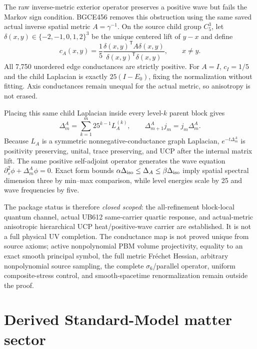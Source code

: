 \documentclass[11pt]{article}
\theoremstyle{definition}
\theoremstyle{remark}
\begin{document}
The raw inverse-metric exterior operator preserves a positive wave but fails the Markov sign condition. BGCE456 removes this obstruction using the same saved actual inverse spatial metric $A=\gamma^{-1}$. On the source child group $C_5^3$, let $\delta(x,y)\in\{-2,-1,0,1,2\}^3$ be the unique centered lift of $y-x$ and define
\begin{equation}\label{eq:conductance09}
 c_A(x,y)=\frac15\frac{\delta(x,y)^{\mathsf T}A\delta(x,y)}
 {\delta(x,y)^{\mathsf T}\delta(x,y)},
 \qquad x\ne y.
\end{equation}
All 7,750 unordered edge conductances are strictly positive. For $A=I$, $c_I=1/5$ and the child Laplacian is exactly $25(I-E_0)$, fixing the normalization without fitting. Axis conductances remain unequal for the actual metric, so anisotropy is not erased.

Placing this same child Laplacian inside every level-$k$ parent block gives
\begin{equation}
 \Delta_m^A=\sum_{k=1}^{m}25^{k-1}L_A^{(k)},
 \qquad
 \Delta_{m+1}^Aj_m=j_m\Delta_m^A.
\end{equation}
Because $L_A$ is a symmetric nonnegative-conductance graph Laplacian, $e^{-t\Delta_m^A}$ is positivity preserving, unital, trace preserving, and UCP after the internal matrix lift. The same positive self-adjoint operator generates the wave equation $\partial_s^2\phi+\Delta_m^A\phi=0$. Exact form bounds $\alpha\Delta_{\rm iso}\le\Delta_A\le\beta\Delta_{\rm iso}$ imply spatial spectral dimension three by min--max comparison, while level energies scale by 25 and wave frequencies by five.

The package status is therefore \emph{closed scoped}: the all-refinement block-local quantum channel, actual UB612 same-carrier quartic response, and actual-metric anisotropic hierarchical UCP heat/positive-wave carrier are established. It is not a full physical UV completion. The conductance map is not proved unique from source axioms; active nonpolynomial PBM volume projectivity, equality to an exact smooth principal symbol, the full metric Fr\'echet Hessian, arbitrary nonpolynomial source sampling, the complete $\sigma_6$/parallel operator, uniform composite-stress control, and smooth-spacetime renormalization remain outside the proof.

\section{Derived Standard-Model matter sector}\label{sec:sm082}
\end{document}
